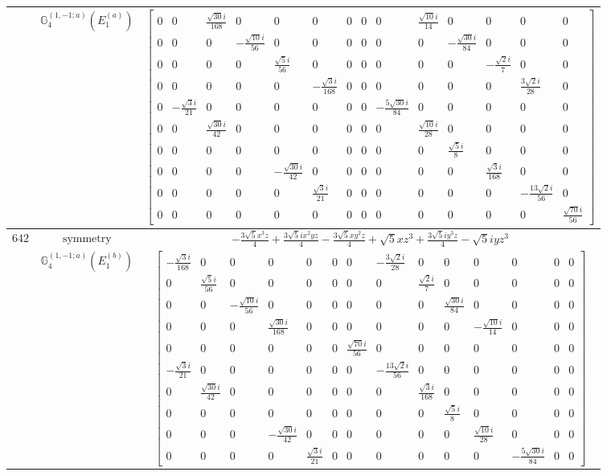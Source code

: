 \documentclass[fleqn,8pt,landscape]{jsarticle}
\begin{document}
\begin{longtable}{ccc}
$  $ & $ \mathbb{G}_{4}^{(1,-1;a)}(E_{1}^{(a)}) $ & $ \begin{bmatrix} 0 & 0 & \frac{\sqrt{30} i}{168} & 0 & 0 & 0 & 0 & 0 & 0 & \frac{\sqrt{10} i}{14} & 0 & 0 & 0 & 0 \\ 0 & 0 & 0 & - \frac{\sqrt{10} i}{56} & 0 & 0 & 0 & 0 & 0 & 0 & - \frac{\sqrt{30} i}{84} & 0 & 0 & 0 \\ 0 & 0 & 0 & 0 & \frac{\sqrt{5} i}{56} & 0 & 0 & 0 & 0 & 0 & 0 & - \frac{\sqrt{2} i}{7} & 0 & 0 \\ 0 & 0 & 0 & 0 & 0 & - \frac{\sqrt{3} i}{168} & 0 & 0 & 0 & 0 & 0 & 0 & \frac{3 \sqrt{2} i}{28} & 0 \\ 0 & - \frac{\sqrt{3} i}{21} & 0 & 0 & 0 & 0 & 0 & 0 & - \frac{5 \sqrt{30} i}{84} & 0 & 0 & 0 & 0 & 0 \\ 0 & 0 & \frac{\sqrt{30} i}{42} & 0 & 0 & 0 & 0 & 0 & 0 & \frac{\sqrt{10} i}{28} & 0 & 0 & 0 & 0 \\ 0 & 0 & 0 & 0 & 0 & 0 & 0 & 0 & 0 & 0 & \frac{\sqrt{5} i}{8} & 0 & 0 & 0 \\ 0 & 0 & 0 & 0 & - \frac{\sqrt{30} i}{42} & 0 & 0 & 0 & 0 & 0 & 0 & \frac{\sqrt{3} i}{168} & 0 & 0 \\ 0 & 0 & 0 & 0 & 0 & \frac{\sqrt{3} i}{21} & 0 & 0 & 0 & 0 & 0 & 0 & - \frac{13 \sqrt{2} i}{56} & 0 \\ 0 & 0 & 0 & 0 & 0 & 0 & 0 & 0 & 0 & 0 & 0 & 0 & 0 & \frac{\sqrt{70} i}{56} \end{bmatrix} $ \\ \hline
$ 642 $ & $ \text{symmetry} $ & $ - \frac{3 \sqrt{5} x^{3} z}{4} + \frac{3 \sqrt{5} i x^{2} y z}{4} - \frac{3 \sqrt{5} x y^{2} z}{4} + \sqrt{5} x z^{3} + \frac{3 \sqrt{5} i y^{3} z}{4} - \sqrt{5} i y z^{3} $ \\
$  $ & $ \mathbb{G}_{4}^{(1,-1;a)}(E_{1}^{(b)}) $ & $ \begin{bmatrix} - \frac{\sqrt{3} i}{168} & 0 & 0 & 0 & 0 & 0 & 0 & - \frac{3 \sqrt{2} i}{28} & 0 & 0 & 0 & 0 & 0 & 0 \\ 0 & \frac{\sqrt{5} i}{56} & 0 & 0 & 0 & 0 & 0 & 0 & \frac{\sqrt{2} i}{7} & 0 & 0 & 0 & 0 & 0 \\ 0 & 0 & - \frac{\sqrt{10} i}{56} & 0 & 0 & 0 & 0 & 0 & 0 & \frac{\sqrt{30} i}{84} & 0 & 0 & 0 & 0 \\ 0 & 0 & 0 & \frac{\sqrt{30} i}{168} & 0 & 0 & 0 & 0 & 0 & 0 & - \frac{\sqrt{10} i}{14} & 0 & 0 & 0 \\ 0 & 0 & 0 & 0 & 0 & 0 & \frac{\sqrt{70} i}{56} & 0 & 0 & 0 & 0 & 0 & 0 & 0 \\ - \frac{\sqrt{3} i}{21} & 0 & 0 & 0 & 0 & 0 & 0 & - \frac{13 \sqrt{2} i}{56} & 0 & 0 & 0 & 0 & 0 & 0 \\ 0 & \frac{\sqrt{30} i}{42} & 0 & 0 & 0 & 0 & 0 & 0 & \frac{\sqrt{3} i}{168} & 0 & 0 & 0 & 0 & 0 \\ 0 & 0 & 0 & 0 & 0 & 0 & 0 & 0 & 0 & \frac{\sqrt{5} i}{8} & 0 & 0 & 0 & 0 \\ 0 & 0 & 0 & - \frac{\sqrt{30} i}{42} & 0 & 0 & 0 & 0 & 0 & 0 & \frac{\sqrt{10} i}{28} & 0 & 0 & 0 \\ 0 & 0 & 0 & 0 & \frac{\sqrt{3} i}{21} & 0 & 0 & 0 & 0 & 0 & 0 & - \frac{5 \sqrt{30} i}{84} & 0 & 0 \end{bmatrix} $ \\ \hline

\end{longtable}
\end{document}
